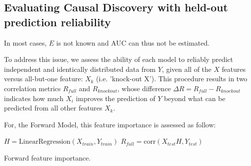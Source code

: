 \begin{figure}
  \centering
  \label{}
\end{figure}


\subsection{Evaluating Causal Discovery with held-out prediction reliability}

In most cases, $E$ is not known and AUC can thus not be estimated.

To address this issue, we assess the ability of each model to reliably predict
independent and identically distributed data from $Y$, given all of the $X$
features versus all-but-one feature: $X_k$ (i.e. 'knock-out X'). This procedure
results in two correlation metrics $R_{full}$ and $R_{knockout}$, whose
difference $\Delta R=R_{full}-R_{knockout}$ indicates how much $X_i$ improves
the prediction of $Y$%
beyond what can be predicted from all other
features $X_k$.

For, the Forward Model, this feature importance is assessed as follow:

\begin{algorithm}[H]
      $H = \text{LinearRegression}(X_{train},
Y_{train})$\; $R_{full} = \text{corr}(X_{test} H, Y_{test})$\;

     
\caption{Forward feature importance.} \label{algorithm:fwd_fi} \end{algorithm}

